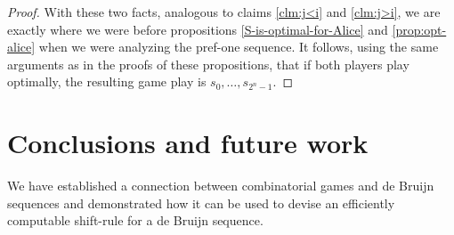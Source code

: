 \documentclass[final,12pt]{elsarticle}
\theoremstyle{definition} \newtheorem{definition}[theorem]{Definition} \newtheorem{observation}[theorem]{Observation} \newtheorem{example}[theorem]{Example} \newtheorem{remark}[theorem]{Remark} \newtheorem{corrolary}[theorem]{Corrolary}
\newcommand{\T}[1]{\langle{#1}\rangle} \DeclareMathOperator{\drop}{drop} \DeclareMathOperator{\dropbits}{drop\_bits} \DeclareMathOperator{\dropstates}{drop\_states} \DeclareMathOperator{\leadingForm}{LeadingForm} \DeclareMathOperator{\dv}{div} %
\newcommand\game[2]{ \foreach \b [count=\s] in #1 { \node[draw, circle,fill=color\b!50!yellow,inner sep=1pt] at ({360/\n * (\s - 1)}:\radius) {$\b$}; \draw[<-, >=latex] ({360/\n * (\s-1)+\margin}:\radius) arc ({360/\n * (\s - 1)+\margin}:{360/\n * (\s)-\margin}:\radius); } \draw[vecArrow,fill=gray] (0,0) to (360/\n * #2:\radius*.8); \node[draw, circle, fill=yellow!30!gray] at (0,0) {}; }
\begin{document}
\begin{proof}
	With these two facts, analogous to claims \ref{clm:j<i} and  \ref{clm:j>i}, we are exactly where we were before propositions \ref{S-is-optimal-for-Alice} and \ref{prop:opt-alice} when we were analyzing the pref-one sequence. It follows, using the same arguments as in the proofs of these propositions, that if both players play optimally, the resulting game play is $s_0,\dots,s_{2^n-1}$.
\end{proof}

%
%	
%		
%			
%			
%			
%			
%			
%		


\section{Conclusions and future work}
We have established a connection between combinatorial games and de Bruijn sequences and demonstrated how it can be used to devise an efficiently computable shift-rule for a de Bruijn sequence.
\end{document}
